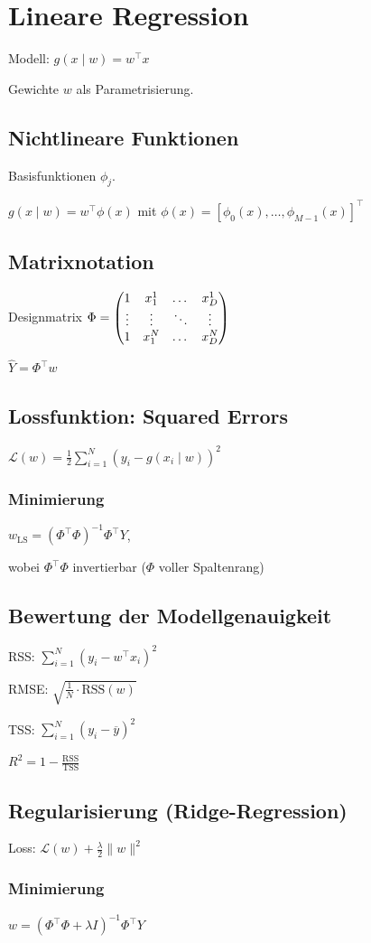 \section*{Lineare Regression}
Modell: $g(x \mid w) = w^\top x$

Gewichte $w$ als Parametrisierung.

\subsection*{Nichtlineare Funktionen}
Basisfunktionen $\phi_j$.

$g(x \mid w) = w^\top \phi(x)$ mit $\phi(x) = [\phi_0(x), \ldots, \phi_{M-1}(x)]^\top$

\subsection*{Matrixnotation}
Designmatrix $\Phi=\begin{pmatrix} 1 & x_1^1 & \dots & x_D^1 \\ \vdots & \vdots & \ddots & \vdots \\ 1 & x_1^N & \dots & x_D^N \end{pmatrix}$

$\hat{Y} = \Phi^\top w$

\subsection*{Lossfunktion: Squared Errors}
$\displaystyle \mathcal{L}(w) = \frac{1}{2}\sum_{i=1}^N (y_i - g(x_i \mid w))^2$

\subsubsection*{Minimierung}
$w_{\text{LS}} = (\Phi^\top \Phi)^{-1} \Phi^\top Y$,

wobei $\Phi^\top \Phi$ invertierbar ($\Phi$ voller Spaltenrang)

\subsection*{Bewertung der Modellgenauigkeit}
RSS: $\displaystyle \sum_{i=1}^N (y_i - w^\top x_i)^2$

RMSE: $\displaystyle \sqrt{\frac{1}{N}\cdot\text{RSS}(w)}$

TSS: $\displaystyle \sum_{i=1}^N (y_i - \overline{y})^2$

$\displaystyle R^2 = 1 - \frac{\text{RSS}}{\text{TSS}}$

\subsection*{Regularisierung (Ridge-Regression)}
Loss: $\displaystyle \mathcal{L}(w) + \frac{\lambda}{2}\|w\|^2$

\subsubsection*{Minimierung}
$w = (\Phi^\top \Phi + \lambda I)^{-1} \Phi^\top Y$
